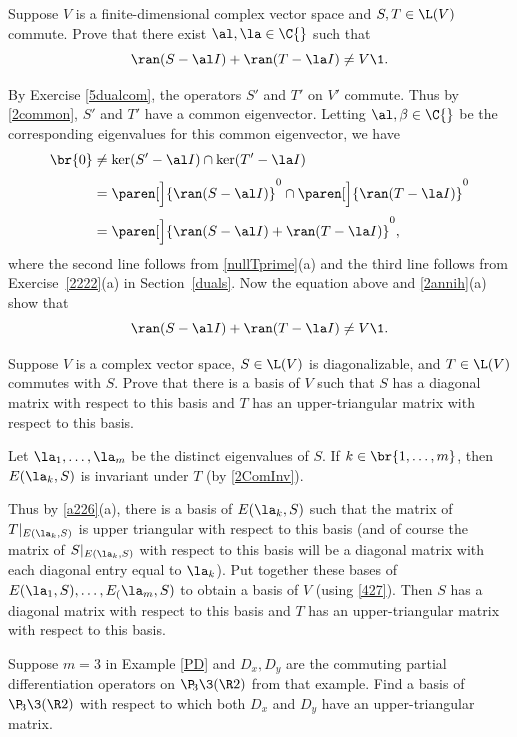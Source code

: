 \exercise
Suppose $V$ is a finite-dimensional complex vector space and $S, T \in \L(V)$ commute. Prove that there exist $\al, \la \in \C{}$ such that
\[
\ran (S - \al I) + \ran (T - \la I) \ne V\1.
\]
\exercisedisplayend

\begin{Solution}
By Exercise \ref{5dualcom}, the operators $S'$ and $T'$ on $V'$ commute. Thus by \ref{2common}, $S'$ and $T'$ have a common eigenvector. Letting $\al, \beta \in \C{}$ be the corresponding eigenvalues for this common eigenvector, we have
\begin{align*}
\br{0} &\ne \ker(S' - \al I) \cap \ker(T' - \la I) \\[3bp]
&= \paren[\Big]{\ran(S - \al I)}^0 \cap \paren[\Big]{\ran(T - \la I)}^0 \\[3bp]
&= \paren[\Big]{ \ran(S - \al I) + \ran(T - \la I)}^0,
\end{align*}
where the second line follows from \ref{nullTprime}(a) and the third line follows from Exercise~\ref{2222}(a) in Section~\ref{duals}. Now the equation above and \ref{2annih}(a) show that
\[
\ran (S - \al I) + \ran (T - \la I) \ne V\1.
\]
\end{Solution}

\exercise
Suppose $V$ is a complex vector space, $S \in \L(V)$ is diagonalizable, and $T \in \L(V)$ commutes with $S$. Prove that there is a basis of $V$ such that $S$ has a diagonal matrix with respect to this basis and $T$ has an upper-triangular matrix with respect to this basis.

\begin{Solution}
Let $\la_1, \ldots, \la_m$ be the distinct eigenvalues of $S$. If $k \in \br{1, \dots, m}$, then $E(\la_k, S)$ is invariant under $T$ (by \ref{2ComInv}).

Thus by \ref{a226}(a), there is a basis of $E(\la_k, S)$ such that the matrix of $T|_{E(\la_k, S)}$ is upper triangular with respect to this basis (and of course the matrix of $S|_{E(\la_k, S)}$ with respect to this basis will be a diagonal matrix with each diagonal entry equal to $\la_k$). Put together these bases of $E(\la_1,S),  \ldots, E_(\la_m, S)$ to obtain a basis of $V$ (using \ref{427}). Then $S$ has a diagonal matrix with respect to this basis and $T$ has an upper-triangular matrix with respect to this basis.
\end{Solution}

\exercise
Suppose $m = 3$ in Example \ref{PD} and $D_x, D_y$ are the commuting partial differentiation operators on $\P\!_3\3(\R2)$ from that example. Find a basis of $\P\!_3\3(\R2)$ with respect to which both $D_x$ and $D_y$ have an upper-triangular matrix.

